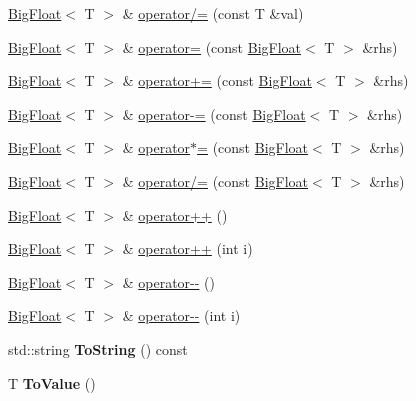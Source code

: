 \begin{DoxyCompactItemize}
\item 
\hyperlink{classatl_1_1_big_float}{Big\+Float}$<$ T $>$ \& \hyperlink{classatl_1_1_big_float_a83987ae679bbd80f92814a590b25330a}{operator/=} (const T \&val)
\item 
\hyperlink{classatl_1_1_big_float}{Big\+Float}$<$ T $>$ \& \hyperlink{classatl_1_1_big_float_a1f1ff461f983fabe7e998e5b380be559}{operator=} (const \hyperlink{classatl_1_1_big_float}{Big\+Float}$<$ T $>$ \&rhs)
\item 
\hyperlink{classatl_1_1_big_float}{Big\+Float}$<$ T $>$ \& \hyperlink{classatl_1_1_big_float_ab826bbe04607d7c448fad2e2b6ee5f52}{operator+=} (const \hyperlink{classatl_1_1_big_float}{Big\+Float}$<$ T $>$ \&rhs)
\item 
\hyperlink{classatl_1_1_big_float}{Big\+Float}$<$ T $>$ \& \hyperlink{classatl_1_1_big_float_a990b79b15b45d41c464ccef511807a66}{operator-\/=} (const \hyperlink{classatl_1_1_big_float}{Big\+Float}$<$ T $>$ \&rhs)
\item 
\hyperlink{classatl_1_1_big_float}{Big\+Float}$<$ T $>$ \& \hyperlink{classatl_1_1_big_float_aa3ba6da8289a8640ac56f3ff48d9e136}{operator$\ast$=} (const \hyperlink{classatl_1_1_big_float}{Big\+Float}$<$ T $>$ \&rhs)
\item 
\hyperlink{classatl_1_1_big_float}{Big\+Float}$<$ T $>$ \& \hyperlink{classatl_1_1_big_float_a3a104f7994d88eb31b8b2fd50920e7d4}{operator/=} (const \hyperlink{classatl_1_1_big_float}{Big\+Float}$<$ T $>$ \&rhs)
\item 
\hyperlink{classatl_1_1_big_float}{Big\+Float}$<$ T $>$ \& \hyperlink{classatl_1_1_big_float_afd0945c6e2169ddc138d060bc7c0c0f2}{operator++} ()
\item 
\hyperlink{classatl_1_1_big_float}{Big\+Float}$<$ T $>$ \& \hyperlink{classatl_1_1_big_float_ac0b296feb7f08d83aca235d0ddd123f7}{operator++} (int i)
\item 
\hyperlink{classatl_1_1_big_float}{Big\+Float}$<$ T $>$ \& \hyperlink{classatl_1_1_big_float_a7396bfd88ac7915acd1a75540067901c}{operator-\/-\/} ()
\item 
\hyperlink{classatl_1_1_big_float}{Big\+Float}$<$ T $>$ \& \hyperlink{classatl_1_1_big_float_a560156ec42da6cb5573db0fd1ba26dc3}{operator-\/-\/} (int i)
\item 
\hypertarget{classatl_1_1_big_float_ae321475114b4d561d61426c3cf8418c9}{std\+::string {\bfseries To\+String} () const }\label{classatl_1_1_big_float_ae321475114b4d561d61426c3cf8418c9}

\item 
\hypertarget{classatl_1_1_big_float_a94696184af313952faeaca5b0a16e965}{T {\bfseries To\+Value} ()}\label{classatl_1_1_big_float_a94696184af313952faeaca5b0a16e965}

\end{DoxyCompactItemize}
